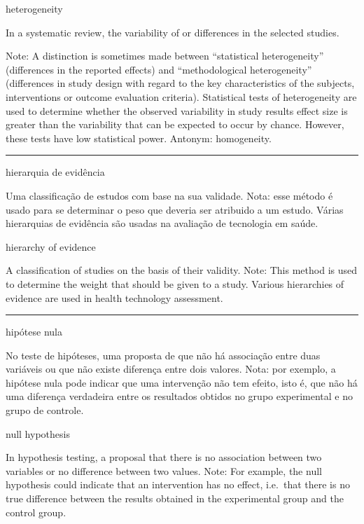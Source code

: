 \documentclass[
]{book}
\begin{document}
heterogeneity

In a systematic review, the variability of or differences in the selected studies.

Note: A distinction is sometimes made between ``statistical heterogeneity'' (differences in the reported effects) and ``methodological heterogeneity'' (differences in study design with regard to the key characteristics of the subjects, interventions or outcome evaluation criteria). Statistical tests of heterogeneity are used to determine whether the observed variability in study results effect size is greater than the variability that can be expected to occur by chance. However, these tests have low statistical power. Antonym: homogeneity.

\begin{center}\rule{0.5\linewidth}{0.5pt}\end{center}

hierarquia de evidência

Uma classificação de estudos com base na sua validade. Nota: esse método é usado para se determinar o peso que deveria ser atribuido a um estudo. Várias hierarquias de evidência são usadas na avaliação de tecnologia em saúde.

hierarchy of evidence

A classification of studies on the basis of their validity. Note: This method is used to determine the weight that should be given to a study. Various hierarchies of evidence are used in health technology assessment.

\begin{center}\rule{0.5\linewidth}{0.5pt}\end{center}

hipótese nula

No teste de hipóteses, uma proposta de que não há associação entre duas variáveis ou que não existe diferença entre dois valores. Nota: por exemplo, a hipótese nula pode indicar que uma intervenção não tem efeito, isto é, que não há uma diferença verdadeira entre os resultados obtidos no grupo experimental e no grupo de controle.

null hypothesis

In hypothesis testing, a proposal that there is no association between two variables or no difference between two values. Note: For example, the null hypothesis could indicate that an intervention has no effect, i.e.~that there is no true difference between the results obtained in the experimental group and the control group.
\end{document}
